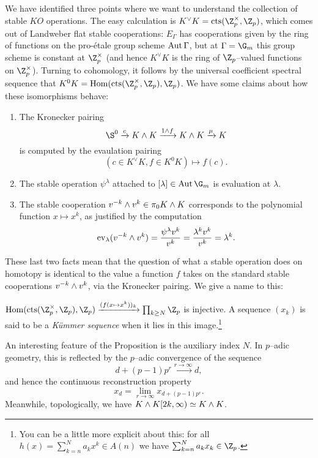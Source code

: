 We have identified three points where we want to understand the collection of stable $KO$ operations.  The easy calculation is $K^\vee K = \cts(\Z_p^\times, \Z_p)$, which comes out of Landweber flat stable cooperations: $E_\Gamma$ has cooperations given by the ring of functions on the pro-\'etale group scheme $\operatorname{Aut} \Gamma$, but at $\Gamma = \G_m$ this group scheme is constant at $\Z_p^\times$ (and hence $K^\vee K$ is the ring of $\Z_p$--valued functions on $\Z_p^\times$).  Turning to cohomology, it follows by the universal coefficient spectral sequence that $K^0 K = \Hom(\cts(\Z_p^\times, \Z_p), \Z_p)$.  We have some claims about how these isomorphisms behave:
\begin{enumerate}
    \item The Kronecker pairing \[\S^0 \xrightarrow{c} K \sm K \xrightarrow{1 \sm f} K \sm K \xrightarrow{\mu} K\] is computed by the evaulation pairing \[(c \in K^\vee K, f \in K^0 K) \mapsto f(c).\]
    \item The stable operation $\psi^\lambda$ attached to $[\lambda] \in \Aut \G_m$ is evaluation at $\lambda$.
    \item The stable cooperation $v^{-k} \wedge v^k \in \pi_0 K \wedge K$ corresponds to the polynomial function $x \mapsto x^k$, as justified by the computation \[\operatorname{ev}_{\lambda}(v^{-k} \wedge v^k) = \frac{\psi^\lambda v^k}{v^k} = \frac{\lambda^k v^k}{v^k} = \lambda^k.\]
\end{enumerate}

These last two facts mean that the question of what a stable operation does on homotopy is identical to the value a function $f$ takes on the standard stable cooperations $v^{-k} \wedge v^k$, via the Kronecker pairing.  We give a name to this:
\begin{proposition}
$\Hom(\cts(\Z_p^\times, \Z_p), \Z_p) \xrightarrow{(f(x \mapsto x^k))_k} \prod_{k \ge N} \Z_p$ is injective.  A sequence $(x_k)$ is said to be a \emph{K\"ummer sequence} when it lies in this image.\footnote{You can be a little more explicit about this: for all $h(x) = \sum_{k=n}^N a_k x^k \in A(n)$ we have $\sum_{k=n}^N a_k x_k \in \Z_p$.}
\end{proposition}

An interesting feature of the Proposition is the auxiliary index $N$.  In $p$--adic geometry, this is reflected by the $p$--adic convergence of the sequence \[d + (p-1)p^r \xrightarrow{r \to \infty} d,\] and hence the continuous reconstruction property \[x_d = \lim_{r \to \infty} x_{d + (p-1)p^r}.\]  Meanwhile, topologically, we have $K \wedge K[2k, \infty) \simeq K \wedge K$.

